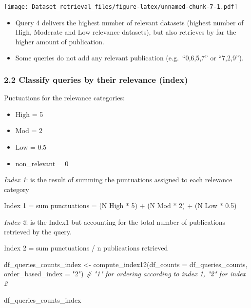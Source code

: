 \documentclass[
]{article}
\newenvironment{Shaded}{\begin{snugshade}}{\end{snugshade}}
\newcommand{\AttributeTok}[1]{\textcolor[rgb]{0.77,0.63,0.00}{#1}}
\newcommand{\CommentTok}[1]{\textcolor[rgb]{0.56,0.35,0.01}{\textit{#1}}}
\newcommand{\FunctionTok}[1]{\textcolor[rgb]{0.00,0.00,0.00}{#1}}
\newcommand{\NormalTok}[1]{#1}
\newcommand{\OtherTok}[1]{\textcolor[rgb]{0.56,0.35,0.01}{#1}}
\newcommand{\StringTok}[1]{\textcolor[rgb]{0.31,0.60,0.02}{#1}}
\providecommand{\tightlist}{%
  \setlength{\itemsep}{0pt}\setlength{\parskip}{0pt}}
\begin{document}
\texttt{[image: Dataset\_retrieval\_files/figure-latex/unnamed-chunk-7-1.pdf]}

\begin{itemize}
\item
  Query 4 delivers the highest number of relevant datasets (highest
  number of High, Moderate and Low relevance datasets), but also
  retrieves by far the higher amount of publication.
\item
  Some queries do not add any relevant publication (e.g.~``0,6,5,7'' or
  ``7,2,9'').
\end{itemize}

\hypertarget{classify-queries-by-their-relevance-index}{%
\subsubsection{2.2 Classify queries by their relevance
(index)}\label{classify-queries-by-their-relevance-index}}

Puctuations for the relevance categories:

\begin{itemize}
\tightlist
\item
  High = 5
\item
  Mod = 2
\item
  Low = 0.5
\item
  non\_relevant = 0
\end{itemize}

\emph{Index 1}: is the result of summing the puntuations assigned to
each relevance category

Index 1 = sum punctuations = (N High * 5) + (N Mod * 2) + (N Low * 0.5)

\emph{Index 2}: is the Index1 but accounting for the total number of
publications retrieved by the query.

Index 2 = sum punctuations / n publications retrieved

\begin{Shaded}
\begin{Highlighting}[]
\NormalTok{df\_queries\_counts\_index }\OtherTok{\textless{}{-}} \FunctionTok{compute\_index12}\NormalTok{(}\AttributeTok{df\_counts =}\NormalTok{ df\_queries\_counts, }\AttributeTok{order\_based\_index =} \StringTok{"2"}\NormalTok{) }\CommentTok{\# "1" for ordering according to index 1, "2" for index 2}

\NormalTok{df\_queries\_counts\_index}
\end{Highlighting}
\end{Shaded}
\end{document}
